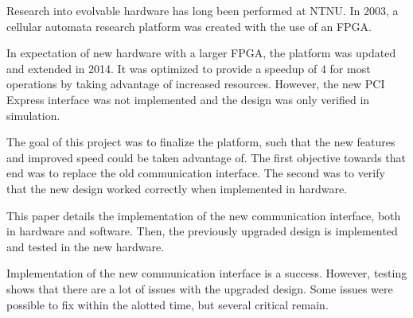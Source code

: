 Research into evolvable hardware has long been performed at NTNU.
In 2003, a cellular automata research platform was created with the use of an FPGA.

In expectation of new hardware with a larger FPGA, the platform was updated and extended in 2014.
It was optimized to provide a speedup of 4 for most operations by taking advantage of increased resources.
However, the new PCI Express interface was not implemented and the design was only verified in simulation.

The goal of this project was to finalize the platform, such that the new features and improved speed could be taken advantage of.
The first objective towards that end was to replace the old communication interface.
The second was to verify that the new design worked correctly when implemented in hardware.

This paper details the implementation of the new communication interface, both in hardware and software.
Then, the previously upgraded design is implemented and tested in the new hardware.

Implementation of the new communication interface is a success.
However, testing shows that there are a lot of issues with the upgraded design.
Some issues were possible to fix within the alotted time, but several critical remain.

